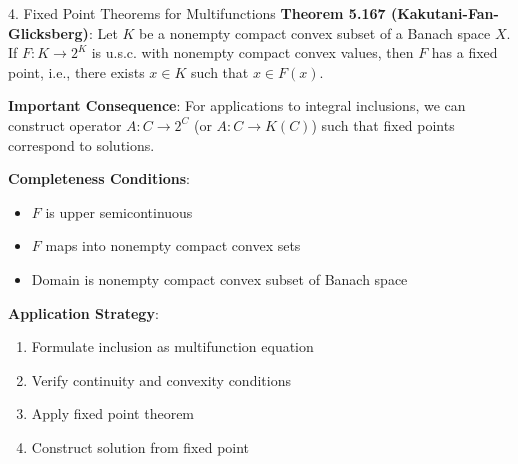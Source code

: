 \documentclass[aspectratio=169,10pt]{beamer}
\begin{document}
\begin{frame}[allowframebreaks]{4. Fixed Point Theorems for Multifunctions}
    \textbf{Theorem 5.167 (Kakutani-Fan-Glicksberg)}:
    Let $K$ be a nonempty compact convex subset of a Banach space $X$. If $F: K \to 2^K$ is u.s.c. with nonempty compact convex values, then $F$ has a fixed point, i.e., there exists $x \in K$ such that $x \in F(x)$.

    \vspace{0.4cm}
    \textbf{Important Consequence}:
    For applications to integral inclusions, we can construct operator $A: C \to 2^C$ (or $A: C \to K(C)$) such that fixed points correspond to solutions.

    \vspace{0.4cm}
    \textbf{Completeness Conditions}:
    \begin{itemize}
        \item $F$ is upper semicontinuous
        \item $F$ maps into nonempty compact convex sets
        \item Domain is nonempty compact convex subset of Banach space
    \end{itemize}

    \vspace{0.4cm}
    \textbf{Application Strategy}:
    \begin{enumerate}
        \item Formulate inclusion as multifunction equation
        \item Verify continuity and convexity conditions
        \item Apply fixed point theorem
        \item Construct solution from fixed point
    \end{enumerate}
\end{frame}
\end{document}

